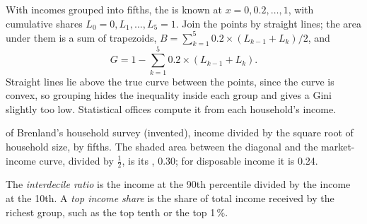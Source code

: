 \begin{measure}
With incomes grouped into fifths, the  is known at $x = 0, 0.2, \dots, 1$, with cumulative shares $L_0 = 0, L_1, \dots, L_5 = 1$. Join the points by straight
lines; the area under them is a sum of trapezoids, $B = \sum_{k=1}^{5} 0.2 \times (L_{k-1} + L_k)/2$, and
\[ G = 1 - \sum_{k=1}^{5} 0.2 \times (L_{k-1} + L_k). \]
Straight lines lie above the true curve between the points, since the curve is convex, so grouping hides the inequality inside each group and gives a Gini slightly
too low. Statistical offices compute it from each household's income.
\end{measure}

\begin{omfigure}

{\small {} of Brenland's household survey (invented), income divided by the square root of household size, by fifths. The shaded area between the diagonal
and the market-income curve, divided by $\tfrac12$, is its , 0.30; for disposable income it is 0.24.}
\end{omfigure}

\begin{definition}\label{def:g11:inequality:interdecile}
The \emph{interdecile ratio} is the income at the 90th percentile divided by the income at the 10th. A \emph{top income share}\label{def:g11:inequality:top-share} is the share of total income received by the richest group, such as the top tenth or the top 1\,\%.
\end{definition}

